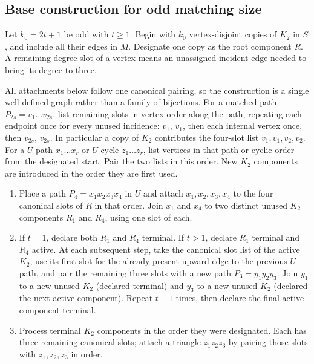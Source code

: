 \documentclass[smallextended,natbib,nospthms]{svjour3}
\theoremstyle{definition}
\theoremstyle{remark}
\begin{document}
\subsection{Base construction for odd matching size}

Let $k_0=2t+1$ be odd with $t\geq 1$. Begin with $k_0$ vertex-disjoint copies
of $K_2$ in $S$, and include all their edges in $M$. Designate one copy as
the root component $R$. A remaining degree slot of a vertex means an
unassigned incident edge needed to bring its degree to three.

All attachments below follow one canonical pairing, so the construction is a
single well-defined graph rather than a family of bijections. For a matched
path $P_{2s}=v_1\ldots v_{2s}$, list remaining slots in vertex order along the
path, repeating each endpoint once for every unused incidence: $v_1$, $v_1$,
then each internal vertex once, then $v_{2s}$, $v_{2s}$. In particular a
copy of $K_2$ contributes the four-slot list $v_1,v_1,v_2,v_2$. For a
$U$-path $x_1\ldots x_r$ or $U$-cycle $z_1\ldots z_r$, list vertices in that
path or cyclic order from the designated start. Pair the two lists in this
order. New $K_2$ components are introduced in the order they are first used.

\begin{enumerate}[leftmargin=2em]
  \item Place a path $P_4=x_1x_2x_3x_4$ in $U$ and attach $x_1,x_2,x_3,x_4$
  to the four canonical slots of $R$ in that order. Join $x_1$ and $x_4$ to
  two distinct unused $K_2$ components $R_1$ and $R_4$, using one slot of
  each.

  \item If $t=1$, declare both $R_1$ and $R_4$ terminal. If $t>1$, declare
  $R_1$ terminal and $R_4$ active. At each subsequent step, take the
  canonical slot list of the active $K_2$, use its first slot for the already
  present upward edge to the previous $U$-path, and pair the remaining three
  slots with a new path $P_3=y_1y_2y_3$. Join $y_1$ to a new unused $K_2$
  (declared terminal) and $y_3$ to a new unused $K_2$ (declared the next
  active component). Repeat $t-1$ times, then declare the final active
  component terminal.

  \item Process terminal $K_2$ components in the order they were designated.
  Each has three remaining canonical slots; attach a triangle
  $z_1z_2z_3$ by pairing those slots with $z_1,z_2,z_3$ in order.
\end{enumerate}
\end{document}
